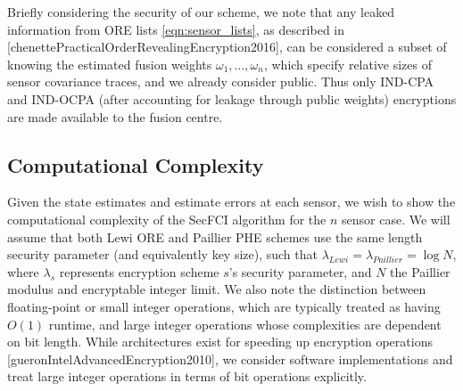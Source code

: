 Briefly considering the security of our scheme, we note that any leaked information from ORE lists \eqref{eqn:sensor_lists}, as described in [chenettePracticalOrderRevealingEncryption2016], can be considered a subset of knowing the estimated fusion weights $\omega_1,\dots,\omega_n$, which specify relative sizes of sensor covariance traces, and we already consider public. Thus only IND-CPA and IND-OCPA (after accounting for leakage through public weights) encryptions are made available to the fusion centre.

% 
% 

\subsection{Computational Complexity} \label{subsec:complexity}
Given the state estimates and estimate errors at each sensor, we wish to show the computational complexity of the SecFCI algorithm for the $n$ sensor case. We will assume that both Lewi ORE and Paillier PHE schemes use the same length security parameter (and equivalently key size), such that $\lambda_{Lewi} = \lambda_{Paillier} = \log{N}$, where $\lambda_{s}$ represents encryption scheme $s$'s security parameter, and $N$ the Paillier modulus and encryptable integer limit. We also note the distinction between floating-point or small integer operations, which are typically treated as having $O(1)$ runtime, and large integer operations whose complexities are dependent on bit length. While architectures exist for speeding up encryption operations [gueronIntelAdvancedEncryption2010], we consider software implementations and treat large integer operations in terms of bit operations explicitly.

